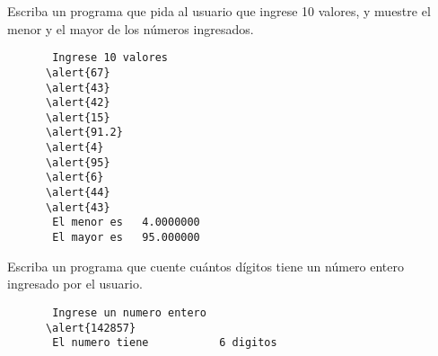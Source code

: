 \documentclass[10pt]{beamer}
\begin{document}
  \begin{frame}
    
  \end{frame}

  \begin{frame}
    
  \end{frame}

  \begin{frame}[fragile]
    Escriba un programa que pida al usuario que ingrese 10 valores,
    y muestre el menor y el mayor de los números ingresados.
    
    \begin{Verbatim}
       Ingrese 10 valores
      \alert{67}
      \alert{43}
      \alert{42}
      \alert{15}
      \alert{91.2}
      \alert{4}
      \alert{95}
      \alert{6}
      \alert{44}
      \alert{43}
       El menor es   4.0000000    
       El mayor es   95.000000    
    \end{Verbatim}

\end{frame}

  \begin{frame}
    
  \end{frame}

  \begin{frame}
    
  \end{frame}

  \begin{frame}[fragile]
    Escriba un programa que cuente
    cuántos dígitos tiene un número entero
    ingresado por el usuario.
    
    \begin{Verbatim}
       Ingrese un numero entero
      \alert{142857}
       El numero tiene           6 digitos
    \end{Verbatim}

\end{frame}

  \begin{frame}
    
  \end{frame}
\end{document}
